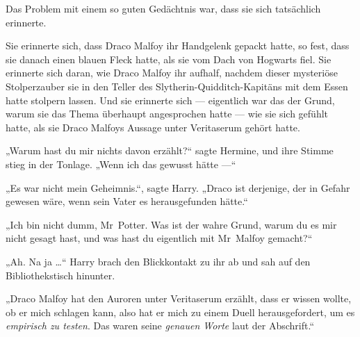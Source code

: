 Das Problem mit einem so guten Gedächtnis war, dass sie sich tatsächlich erinnerte.



Sie erinnerte sich, dass Draco Malfoy ihr Handgelenk gepackt hatte, so fest, dass sie danach einen blauen Fleck hatte, als sie vom Dach von Hogwarts fiel. Sie erinnerte sich daran, wie Draco Malfoy ihr aufhalf, nachdem dieser mysteriöse Stolperzauber sie in den Teller des Slytherin-Quidditch-Kapitäns mit dem Essen hatte stolpern lassen. Und sie erinnerte sich — eigentlich war das der Grund, warum sie das Thema überhaupt angesprochen hatte — wie sie sich gefühlt hatte, als sie Draco Malfoys Aussage unter Veritaserum gehört hatte.

„Warum hast du mir nichts davon erzählt?“ sagte Hermine, und ihre Stimme stieg in der Tonlage.
„Wenn ich das gewusst hätte —“

„Es war nicht mein Geheimnis.“, sagte Harry.
„Draco ist derjenige, der in Gefahr gewesen wäre, wenn sein Vater es herausgefunden hätte.“

„Ich bin nicht dumm, Mr~Potter. Was ist der wahre Grund, warum du es mir nicht gesagt hast, und was hast du eigentlich mit Mr~Malfoy gemacht?“

„Ah. Na ja …“ Harry brach den Blickkontakt zu ihr ab und sah auf den Bibliothekstisch hinunter.

„Draco Malfoy hat den Auroren unter Veritaserum erzählt, dass er wissen wollte, ob er mich schlagen kann, also hat er mich zu einem Duell herausgefordert, um es \emph{empirisch zu testen}. Das waren seine \emph{genauen Worte} laut der Abschrift.“

